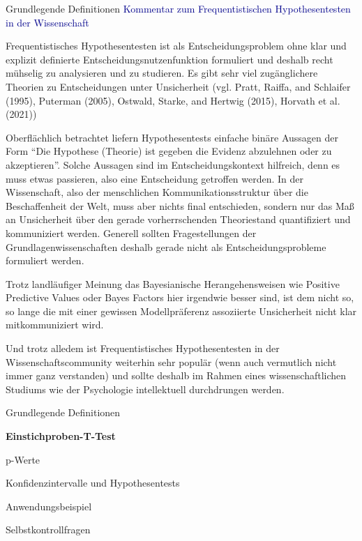 \documentclass[
  8pt,
  ignorenonframetext,
]{beamer}
\begin{document}
\begin{frame}{Grundlegende Definitionen}
\protect\hypertarget{grundlegende-definitionen-15}{}
\textcolor{darkblue}{Kommentar zum Frequentistischen Hypothesentesten in der Wissenschaft}

\small

Frequentistisches Hypothesentesten ist als Entscheidungsproblem ohne
klar und explizit definierte Entscheidungsnutzenfunktion formuliert und
deshalb recht mühselig zu analysieren und zu studieren. Es gibt sehr
viel zugänglichere Theorien zu Entscheidungen unter Unsicherheit (vgl.
Pratt, Raiffa, and Schlaifer (1995), Puterman (2005), Ostwald, Starke,
and Hertwig (2015), Horvath et al. (2021))

Oberflächlich betrachtet liefern Hypothesentests einfache binäre
Aussagen der Form ``Die Hypothese (Theorie) ist gegeben die Evidenz
abzulehnen oder zu akzeptieren''. Solche Aussagen sind im
Entscheidungskontext hilfreich, denn es muss etwas passieren, also eine
Entscheidung getroffen werden. In der Wissenschaft, also der
menschlichen Kommunikationsstruktur über die Beschaffenheit der Welt,
muss aber nichts final entschieden, sondern nur das Maß an Unsicherheit
über den gerade vorherrschenden Theoriestand quantifiziert und
kommuniziert werden. Generell sollten Fragestellungen der
Grundlagenwissenschaften deshalb gerade nicht als Entscheidungsprobleme
formuliert werden.

Trotz landläufiger Meinung das Bayesianische Herangehensweisen wie
Positive Predictive Values oder Bayes Factors hier irgendwie besser
sind, ist dem nicht so, so lange die mit einer gewissen Modellpräferenz
assoziierte Unsicherheit nicht klar mitkommuniziert wird.

Und trotz alledem ist Frequentistisches Hypothesentesten in der
Wissenschaftscommunity weiterhin sehr populär (wenn auch vermutlich
nicht immer ganz verstanden) und sollte deshalb im Rahmen eines
wissenschaftlichen Studiums wie der Psychologie intellektuell
durchdrungen werden.
\end{frame}

\begin{frame}{}
\protect\hypertarget{section-8}{}
\large
\vfill

Grundlegende Definitionen

\textbf{Einstichproben-T-Test}

p-Werte

Konfidenzintervalle und Hypothesentests

Anwendungsbeispiel

Selbstkontrollfragen \vfill
\end{frame}
\end{document}

